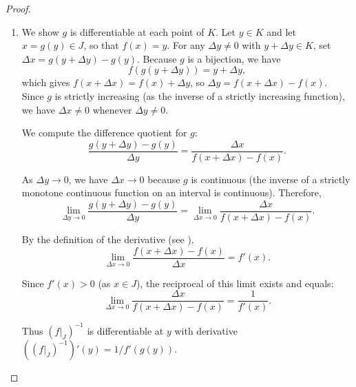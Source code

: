 \begin{proof}
\begin{enumerate}
        \item We show $g$ is differentiable at each point of $K$. Let $y \in K$ and let $x = g(y) \in J$, so that $f(x) = y$. For any $\Delta y \neq 0$ with $y + \Delta y \in K$, set $\Delta x = g(y + \Delta y) - g(y)$. Because $g$ is a bijection, we have
        $$f(g(y + \Delta y)) = y + \Delta y,$$
        which gives $f(x + \Delta x) = f(x) + \Delta y$, so $\Delta y = f(x + \Delta x) - f(x)$. Since $g$ is strictly increasing (as the inverse of a strictly increasing function), we have $\Delta x \neq 0$ whenever $\Delta y \neq 0$.

        We compute the difference quotient for $g$:
        $$\frac{g(y + \Delta y) - g(y)}{\Delta y} = \frac{\Delta x}{f(x + \Delta x) - f(x)}.$$

        As $\Delta y \to 0$, we have $\Delta x \to 0$ because $g$ is continuous (the inverse of a strictly monotone continuous function on an interval is continuous). Therefore,
        $$\lim_{\Delta y \to 0} \frac{g(y + \Delta y) - g(y)}{\Delta y} = \lim_{\Delta x \to 0} \frac{\Delta x}{f(x + \Delta x) - f(x)}.$$

        By the definition of the derivative (see ),
        $$\lim_{\Delta x \to 0} \frac{f(x + \Delta x) - f(x)}{\Delta x} = f'(x).$$

        Since $f'(x) > 0$ (as $x \in J$), the reciprocal of this limit exists and equals:
        $$\lim_{\Delta x \to 0} \frac{\Delta x}{f(x + \Delta x) - f(x)} = \frac{1}{f'(x)}.$$

        Thus $(f|_J)^{-1}$ is differentiable at $y$ with derivative $\left((f|_J)^{-1}\right)'(y) = 1/f'(g(y))$.
    \end{enumerate}
\end{proof}
